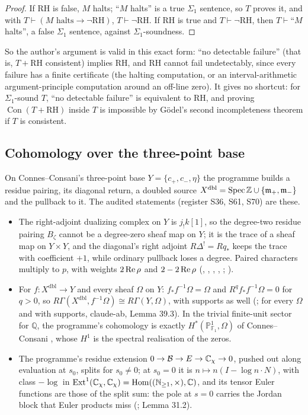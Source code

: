 \begin{proof}
If RH is false, $M$ halts; ``$M$ halts'' is a true $\Sigma_1$ sentence, so $T$ proves it, and with $T\vdash(M\text{ halts}\to\neg\text{RH})$, $T\vdash\neg$RH. If RH is true and $T\vdash\neg$RH, then $T\vdash$``$M$ halts'', a false $\Sigma_1$ sentence, against $\Sigma_1$-soundness.
\end{proof}

So the author's argument is valid in this exact form: ``no detectable failure'' (that is, $T+$RH consistent) implies RH, and RH cannot fail undetectably, since every failure has a finite certificate (the halting computation, or an interval-arithmetic argument-principle computation around an off-line zero). It gives no shortcut: for $\Sigma_1$-sound $T$, ``no detectable failure'' is equivalent to RH, and proving $\operatorname{Con}(T+\text{RH})$ inside $T$ is impossible by Gödel's second incompleteness theorem if $T$ is consistent.

\subsection{Cohomology over the three-point base}

On Connes--Consani's three-point base $Y=\{c_+,c_-,\eta\}$ the programme builds a residue pairing, its diagonal return, a doubled source $X^{\mathrm{dbl}}=\operatorname{Spec}\mathbb{Z}\cup\{\mathfrak m_+,\mathfrak m_-\}$ and the pullback to it. The audited statements (register S36, S61, S70) are these.
\begin{itemize}
\item The right-adjoint dualizing complex on $Y$ is $j_!k[1]$, so the degree-two residue pairing $B_\zeta$ cannot be a degree-zero sheaf map on $Y$; it is the trace of a sheaf map on $Y\times Y$, and the diagonal's right adjoint $R\Delta^!=Rq_*$ keeps the trace with coefficient $+1$, while ordinary pullback loses a degree. Paired characters multiply to $p$, with weights $2\operatorname{Re}\rho$ and $2-2\operatorname{Re}\rho$ (, , , , ; ).
\item For $f:X^{\mathrm{dbl}}\to Y$ and every sheaf $\Omega$ on $Y$: $f_*f^{-1}\Omega=\Omega$ and $R^qf_*f^{-1}\Omega=0$ for $q>0$, so $R\Gamma(X^{\mathrm{dbl}},f^{-1}\Omega)\cong R\Gamma(Y,\Omega)$, with supports as well (; for every $\Omega$ and with supports, claude-ab,  Lemma 39.3). In the trivial finite-unit sector for $\mathbb{Q}$, the programme's cohomology is exactly $H^*(\mathbb{P}^1_{\mathbb{F}_1},\Omega)$ of Connes--Consani \cite{CCP1}, whose $H^1$ is the spectral realisation of the zeros.
\item The programme's residue extension $0\to\mathcal{B}\to E\to\mathbb{C}_\chi\to0$, pushed out along evaluation at $s_0$, splits for $s_0\ne0$; at $s_0=0$ it is $n\mapsto n(I-\log n\cdot N)$, with class $-\log$ in $\operatorname{Ext}^1(\mathbb{C}_\chi,\mathbb{C}_\chi)=\operatorname{Hom}((\mathbb{N}_{\ge1},\times),\mathbb{C})$, and its tensor Euler functions are those of the split sum: the pole at $s=0$ carries the Jordan block that Euler products miss (;  Lemma 31.2).
\end{itemize}

